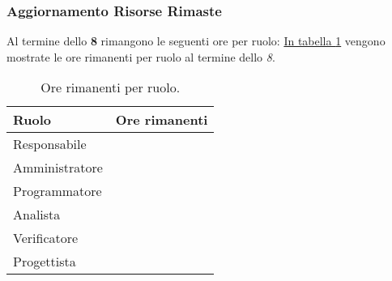 \subsubsection{Aggiornamento Risorse Rimaste}
\label{sec:AggiornamentoRisorse_Sprint8}
Al termine dello \textbf{ 8} rimangono le seguenti ore per ruolo: \hyperref[tab:sprint8_ore_rimanenti]{In tabella \ref{tab:sprint8_ore_rimanenti}} vengono mostrate le ore rimanenti per ruolo al termine dello \textit{ 8}.

\begin{table}[H]
    \centering
    \begin{tabular}{| l | l |}
    \hline
    \textbf{Ruolo} & 
    \textbf{Ore rimanenti}\\
    \hline
        Responsabile & \\
    \hline
        Amministratore & \\
    \hline
        Programmatore & \\
    \hline
        Analista & \\
    \hline
        Verificatore & \\
    \hline
        Progettista & \\
    \hline
    \end{tabular}
    \caption{Ore rimanenti per ruolo.}
    \label{tab:sprint8_ore_rimanenti} 
\end{table}